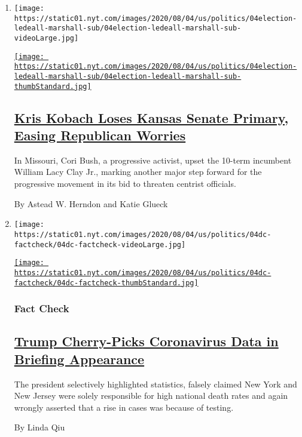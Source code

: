 \begin{enumerate}
\def\labelenumi{\arabic{enumi}.}
\item
  \texttt{[image: https://static01.nyt.com/images/2020/08/04/us/politics/04election-ledeall-marshall-sub/04election-ledeall-marshall-sub-videoLarge.jpg]}

  \href{/2020/08/04/us/politics/kobach-tlaib.html}{\texttt{[image: https://static01.nyt.com/images/2020/08/04/us/politics/04election-ledeall-marshall-sub/04election-ledeall-marshall-sub-thumbStandard.jpg]}}

  \hypertarget{kris-kobach-loses-kansas-senate-primary-easing-republican-worries}{%
  \subsection{\texorpdfstring{\href{/2020/08/04/us/politics/kobach-tlaib.html}{Kris
  Kobach Loses Kansas Senate Primary, Easing Republican
  Worries}}{Kris Kobach Loses Kansas Senate Primary, Easing Republican Worries}}\label{kris-kobach-loses-kansas-senate-primary-easing-republican-worries}}

  In Missouri, Cori Bush, a progressive activist, upset the 10-term
  incumbent William Lacy Clay Jr., marking another major step forward
  for the progressive movement in its bid to threaten centrist
  officials.

  By Astead W. Herndon and Katie Glueck
\item
  \texttt{[image: https://static01.nyt.com/images/2020/08/04/us/politics/04dc-factcheck/04dc-factcheck-videoLarge.jpg]}

  \href{/2020/08/04/us/politics/coronavirus-trump-data-briefing.html}{\texttt{[image: https://static01.nyt.com/images/2020/08/04/us/politics/04dc-factcheck/04dc-factcheck-thumbStandard.jpg]}}

  \hypertarget{fact-check}{%
  \subsubsection{Fact Check}\label{fact-check}}

  \hypertarget{trump-cherry-picks-coronavirus-data-in-briefing-appearance}{%
  \subsection{\texorpdfstring{\href{/2020/08/04/us/politics/coronavirus-trump-data-briefing.html}{Trump
  Cherry-Picks Coronavirus Data in Briefing
  Appearance}}{Trump Cherry-Picks Coronavirus Data in Briefing Appearance}}\label{trump-cherry-picks-coronavirus-data-in-briefing-appearance}}

  The president selectively highlighted statistics, falsely claimed New
  York and New Jersey were solely responsible for high national death
  rates and again wrongly asserted that a rise in cases was because of
  testing.

  By Linda Qiu
\end{enumerate}

